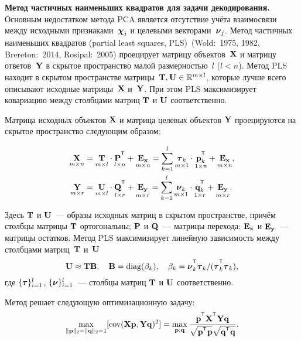 \documentclass[11pt, a5paper]{dissert}
\begin{document}
\vspace{0.5cm}
\textbf{Метод частичных наименьших квадратов для задачи декодирования.}
Основным недостатком метода PCA является отсутствие учёта взаимосвязи между исходными признаками~$\boldsymbol{\chi}_j$ и целевыми векторами~$\boldsymbol{\nu}_j$.
Метод частичных наименьших квадратов (partial least squares, PLS)~(Wold:~1975, 1982, Brereton:~2014, Rosipal:~2005) проецирует матрицу объектов~$\mathbf{X}$ и матрицу ответов~$\mathbf{Y}$ в скрытое пространство малой размерностью~$l$ ($l < n$).
Метод PLS находит в скрытом пространстве матрицы~$\mathbf{T}, \mathbf{U} \in \mathbb{R}^{m \times l}$, которые лучше всего описывают исходные матрицы~$\mathbf{X}$ и~$\mathbf{Y}$. 
При этом PLS максимизирует ковариацию между столбцами матриц $\mathbf{T}$ и $\mathbf{U}$ соответственно.

Матрица исходных объектов $\mathbf{X}$ и матрица целевых объектов $\mathbf{Y}$ проецируются на скрытое пространство следующим образом:

\begin{align}
	\label{ch1:eq:PLS_X}
	\underset{m \times n}{\bX} 
	&= \underset{m \times l}{\bT} \cdot \underset{l \times n}{\bP^{\T}} + \underset{m \times n}{\bE_{\bx}} 
	= \sum_{k=1}^l \underset{m \times 1}{\btau_k} \cdot \underset{1 \times n}{\bp_k^{\T}} + \underset{m \times n}{\bE_{\bx}},\\
	\label{ch1:eq:PLS_Y}
	\underset{m \times r}{\bY} 
	&= \underset{m \times l}{\bU} \cdot \underset{l \times r}{\bQ^{\T}} + \underset{m \times r}{\bE_{\by}}
	=  \sum_{k=1}^l  \underset{m \times 1}{\bnu_k} \cdot \underset{1 \times r}{\bq_k^{\T}} +  \underset{m \times r}{\bE_{\by}}.
\end{align}

Здесь $\mathbf{T}$ и $\mathbf{U}$~--- образы исходных матриц в скрытом пространстве, причём столбцы матрицы $\mathbf{T}$ ортогональны; $\mathbf{P}$ и $\mathbf{Q}$~--- матрицы перехода; $\mathbf{E}_{\mathbf{x}}$ и $\mathbf{E}_{\mathbf{y}}$~--- матрицы остатков. 
Метод PLS максимизирует линейную зависимость между столбцами матриц~$\mathbf{T}$ и~$\mathbf{U}$
\begin{equation*}
	\bU \approx \bT \bB, \quad \bB = \text{diag}(\beta_k), \quad \beta_k = \bnu_k^{\T}\btau_k / (\btau_k^{\T}\btau_k),
\end{equation*}
где $\{\boldsymbol{\tau}\}_{i=1}^l$, $\{\boldsymbol{\nu}\}_{i=1}^l$~--- столбцы матриц $\mathbf{T}$ и $\mathbf{U}$ соответственно.

Метод решает следующую оптимизационную задачу:
\begin{equation}
	\max_{\|\bp\|_{2}=\|\bq\|_{2}=1}[ \text{cov}(\bX \bp, \bY \bq)^{2}] = \max_{\bp, \bq} \frac{\bp^{\T} \bX^{\T} \bY \bq}{\sqrt{\bp^{\T} \bp} \sqrt{\bq^{\T} \bq}}.
	\label{ch1:eq:pls_max_cov}
\end{equation}
\end{document}
